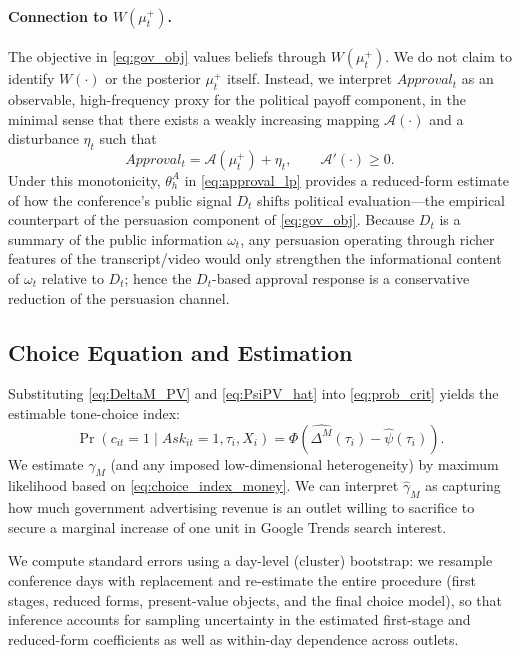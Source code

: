 \documentclass[12pt]{article}
\begin{document}
\paragraph{Connection to $W(\mu_t^{+})$.}
The objective in \eqref{eq:gov_obj} values beliefs through $W(\mu_t^{+})$. We do not claim to identify $W(\cdot)$ or the posterior $\mu_t^{+}$ itself. Instead, we interpret $Approval_t$ as an observable, high-frequency proxy for the political payoff component, in the minimal sense that there exists a weakly increasing mapping $\mathcal{A}(\cdot)$ and a disturbance $\eta_t$ such that
\[
Approval_t = \mathcal{A}\!\left(\mu_t^{+}\right) + \eta_t, \qquad \mathcal{A}'(\cdot)\ge 0.
\]
Under this monotonicity, $\theta^{A}_h$ in \eqref{eq:approval_lp} provides a reduced-form estimate of how the conference's public signal $D_t$ shifts political evaluation---the empirical counterpart of the persuasion component of \eqref{eq:gov_obj}. Because $D_t$ is a summary of the public information $\omega_t$, any persuasion operating through richer features of the transcript/video would only strengthen the informational content of $\omega_t$ relative to $D_t$; hence the $D_t$-based approval response is a conservative reduction of the persuasion channel.

\subsection{Choice Equation and Estimation}

Substituting \eqref{eq:DeltaM_PV} and \eqref{eq:PsiPV_hat} into \eqref{eq:prob_crit} yields the estimable tone-choice index:
\begin{equation}\label{eq:choice_index_money}
\Pr(c_{it}=1\mid Ask_{it}=1,\tau_i,X_i)
=
\Phi\!\left(
\widehat{\Delta^{M}}(\tau_i)-\widehat{\psi}(\tau_i)
\right).
\end{equation}
We estimate $\gamma_M$ (and any imposed low-dimensional heterogeneity) by maximum likelihood based on \eqref{eq:choice_index_money}. We can interpret $\hat\gamma_M$ as capturing how much government advertising revenue is an outlet willing to sacrifice to secure a marginal increase of one unit in Google Trends search interest. 

We compute standard errors using a day-level (cluster) bootstrap: we resample conference days with replacement and re-estimate the entire procedure (first stages, reduced forms, present-value objects, and the final choice model), so that inference accounts for sampling uncertainty in the estimated first-stage and reduced-form coefficients as well as within-day dependence across outlets. 
\end{document}
